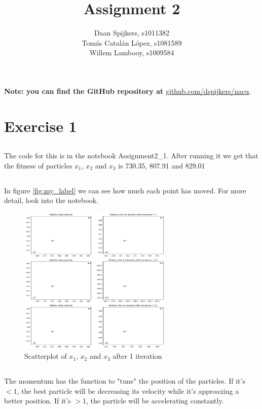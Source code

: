 \documentclass{scrartcl}
\title{Assignment 2}
\author{Daan Spijkers, s1011382\\ Tomás Catalán López, s1081589\\ Willem Lambooy, s1009584}
\begin{document}
\maketitle

\textbf{Note: you can find the GitHub repository at}
\url{github.com/dspijkers/nacu}.

\section{Exercise 1}
\subsection{}
The code for this is in the notebook Assignment2\_1. After running it we get that the fitness of particles $x_1$, $x_2$ and $x_3$ is 730.35, 807.91 and 829.01

\subsection{}
In figure \ref{fig:my_label} we can see how much each point has moved. For more detail, look into the notebook.

\begin{figure}[h!]
    \centering
    \includegraphics[width=0.65\textwidth]{images/1.png}
    \caption{Scatterplot of $x_1$, $x_2$ and $x_3$ after 1 iteration}
    \label{fig:1l}
\end{figure}

\subsection{}
The momentum has the function to "tune" the position of the particles. If it's $<1$, the best particle will be decreasing its velocity while it's approaxing a better position. If it's $>1$, the particle will be accelerating constantly.
\end{document}
